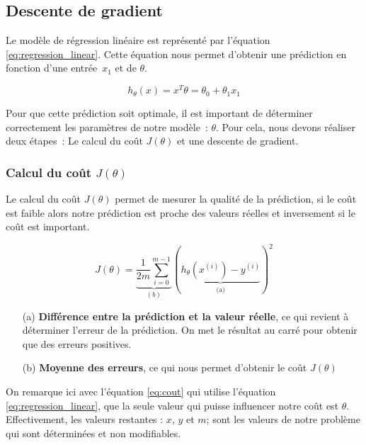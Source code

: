 \subsection{Descente de gradient}

Le modèle de régression linéaire est représenté par l'équation \ref{eq:regression_linear}. Cette équation nous permet d'obtenir une prédiction en fonction d'une entrée~$x_1$ et de $\theta$.

\begin{equation}\label{eq:regression_linear}
    h_\theta(x) = x^T \theta =\theta_0 + \theta_1 x_1
\end{equation}

\noindent
Pour que cette prédiction soit optimale, il est important de déterminer correctement les paramètres de notre modèle~: $\theta$. Pour cela, nous devons réaliser deux étapes~: Le calcul du coût $J(\theta)$ et une descente de gradient.
    


\subsubsection{Calcul du coût $J(\theta)$}
Le calcul du coût $J(\theta)$ permet de mesurer la qualité de la prédiction, si le coût est faible alors notre prédiction est proche des valeurs réelles et inversement si le coût est important.

\begin{equation}\label{eq:cout}
   J(\theta) = \underbrace{\frac{1}{2m} \sum_{i=0}^{m-1}}_{(b)}(\underbrace{h_\theta(x^{(i)}) - y^{(i)}}_{\text{(a)}})^2
\end{equation}

\begin{itemize}
    \item [(a)] \textbf{Différence entre la prédiction et la valeur réelle}, ce qui revient à déterminer l'erreur de la prédiction. On met le résultat au carré pour obtenir que des erreurs positives.
    \item [(b)] \textbf{Moyenne des erreurs}, ce qui nous permet d'obtenir le coût $J(\theta)$
\end{itemize}

\vspace{.3cm}

On remarque ici avec l'équation \ref{eq:cout} qui utilise l'équation \ref{eq:regression_linear}, que la seule valeur qui puisse influencer notre coût est $\theta$. Effectivement, les valeurs restantes : $x$, $y$ et $m$; sont les valeurs
de notre problème qui sont déterminées et non modifiables.


